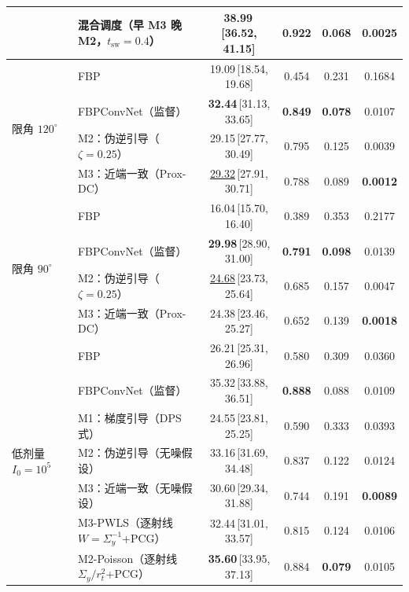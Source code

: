 \begin{tabular}{llcccc}
 & 混合调度（早 M3 晚 M2，$t_{\mathrm{sw}}{=}0.4$） & \textbf{38.99}\,{\scriptsize[36.52, 41.15]} & \textbf{0.922} & 0.068 & 0.0025 \\
\midrule
\multirow{4}{*}{限角 $120^\circ$}
 & FBP & 19.09\,{\scriptsize[18.54, 19.68]} & 0.454 & 0.231 & 0.1684 \\
 & FBPConvNet（监督） & \textbf{32.44}\,{\scriptsize[31.13, 33.65]} & \textbf{0.849} & \textbf{0.078} & 0.0107 \\
 & M2：伪逆引导（$\zeta{=}0.25$） & 29.15\,{\scriptsize[27.77, 30.49]} & 0.795 & 0.125 & 0.0039 \\
 & M3：近端一致（Prox-DC） & \underline{29.32}\,{\scriptsize[27.91, 30.71]} & 0.788 & 0.089 & \textbf{0.0012} \\
\midrule
\multirow{4}{*}{限角 $90^\circ$}
 & FBP & 16.04\,{\scriptsize[15.70, 16.40]} & 0.389 & 0.353 & 0.2177 \\
 & FBPConvNet（监督） & \textbf{29.98}\,{\scriptsize[28.90, 31.00]} & \textbf{0.791} & \textbf{0.098} & 0.0139 \\
 & M2：伪逆引导（$\zeta{=}0.25$） & \underline{24.68}\,{\scriptsize[23.73, 25.64]} & 0.685 & 0.157 & 0.0047 \\
 & M3：近端一致（Prox-DC） & 24.38\,{\scriptsize[23.46, 25.27]} & 0.652 & 0.139 & \textbf{0.0018} \\
\midrule
\multirow{7}{*}{低剂量 $I_0{=}10^5$}
 & FBP & 26.21\,{\scriptsize[25.31, 26.96]} & 0.580 & 0.309 & 0.0360 \\
 & FBPConvNet（监督） & 35.32\,{\scriptsize[33.88, 36.51]} & \textbf{0.888} & 0.088 & 0.0109 \\
 & M1：梯度引导（DPS 式） & 24.55\,{\scriptsize[23.81, 25.25]} & 0.590 & 0.333 & 0.0393 \\
 & M2：伪逆引导（无噪假设） & 33.16\,{\scriptsize[31.69, 34.48]} & 0.837 & 0.122 & 0.0124 \\
 & M3：近端一致（无噪假设） & 30.60\,{\scriptsize[29.34, 31.88]} & 0.744 & 0.191 & \textbf{0.0089} \\
 & M3-PWLS（逐射线 $W{=}\Sigma_y^{-1}$+PCG） & 32.44\,{\scriptsize[31.01, 33.57]} & 0.815 & 0.124 & 0.0106 \\
 & M2-Poisson（逐射线 $\Sigma_y/r_t^2$+PCG） & \textbf{35.60}\,{\scriptsize[33.95, 37.13]} & 0.884 & \textbf{0.079} & 0.0105 \\
\bottomrule
\end{tabular}
